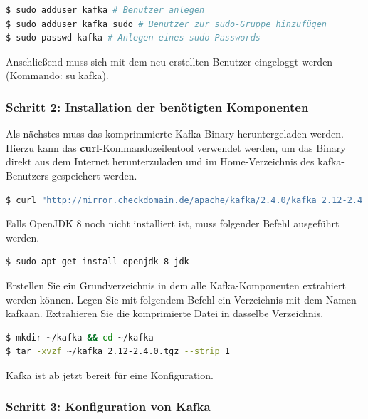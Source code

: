 \documentclass[a4paper,titlepage,halfparskip,12pt]{scrreprt}
\begin{document}
\begin{onehalfspacing}
\smallskip

\begin{lstlisting}[language=Bash]
$ sudo adduser kafka # Benutzer anlegen
$ sudo adduser kafka sudo # Benutzer zur sudo-Gruppe hinzufügen
$ sudo passwd kafka # Anlegen eines sudo-Passwords
\end{lstlisting}

Anschließend muss sich mit dem neu erstellten Benutzer eingeloggt werden (Kommando: su kafka).

\subsubsection*{Schritt 2: Installation der benötigten Komponenten}


Als nächstes muss das komprimmierte Kafka-Binary heruntergeladen werden. Hierzu kann das \textbf{curl}-Kommandozeilentool verwendet werden, um das Binary direkt aus dem Internet herunterzuladen und im Home-Verzeichnis des kafka-Benutzers gespeichert werden.

\smallskip

\begin{lstlisting}[language=Bash]
$ curl "http://mirror.checkdomain.de/apache/kafka/2.4.0/kafka_2.12-2.4.0.tgz" -o ~/kafka_2.12-2.4.0.tgz
\end{lstlisting}

Falls OpenJDK 8 noch nicht installiert ist, muss folgender Befehl ausgeführt werden.

\smallskip

\begin{lstlisting}[language=Bash]
$ sudo apt-get install openjdk-8-jdk
\end{lstlisting}

Erstellen Sie ein Grundverzeichnis in dem alle Kafka-Komponenten extrahiert werden können. Legen Sie mit folgendem Befehl ein Verzeichnis mit dem Namen \glqq kafka\grqq an. Extrahieren Sie die komprimierte Datei in dasselbe Verzeichnis.

\smallskip

\begin{lstlisting}[language=Bash]
$ mkdir ~/kafka && cd ~/kafka
$ tar -xvzf ~/kafka_2.12-2.4.0.tgz --strip 1
\end{lstlisting}

Kafka ist ab jetzt bereit für eine Konfiguration.

\subsubsection*{Schritt 3: Konfiguration von Kafka}


\end{onehalfspacing}
\end{document}
